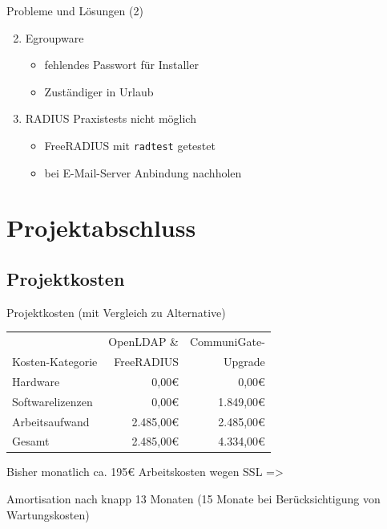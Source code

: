 \documentclass[presentation,svgnames,12pt]{beamer}
\begin{document}
\begin{frame}{Probleme und Lösungen (2)}
\begin{enumerate}
	\setcounter{enumi}{1}
	\item Egroupware
	\vspace{6pt}
	\begin{itemize}
		\item fehlendes Passwort für Installer
		\item Zuständiger in Urlaub
	\end{itemize}
	\medskip
	\item RADIUS Praxistests nicht möglich
	\vspace{6pt}
	\begin{itemize}
		\item FreeRADIUS mit \texttt{radtest} getestet
		\item bei E-Mail-Server Anbindung nachholen
	\end{itemize}
\end{enumerate}
\end{frame}

\section{Projektabschluss}
\subsection{Projektkosten}
\begin{frame}{Projektkosten (mit Vergleich zu Alternative)}
\begin{table}
\centering
	\begin{tabularx}{0.9\textwidth}{|X|r|r|}
		\hline
		 	&	OpenLDAP \& &	CommuniGate-\\
		Kosten-Kategorie	&	FreeRADIUS &	Upgrade\\
		\hline
		Hardware &	0,00\euro{} &	0,00\euro{}\\
		\hline
		Softwarelizenzen &	0,00\euro{} &	1.849,00\euro{}\\
		\hline
		Arbeitsaufwand &	2.485,00\euro{} &	2.485,00\euro{}\\
		\hhline{|=|=|=|}
		Gesamt &	2.485,00\euro{} &	4.334,00\euro{}\\
		\hline
	\end{tabularx}
\end{table}
\bigskip
Bisher monatlich ca. 195\euro{} Arbeitskosten wegen SSL =>

Amortisation nach knapp 13 Monaten (15 Monate bei Berücksichtigung von Wartungskosten)
\end{frame}
\end{document}
